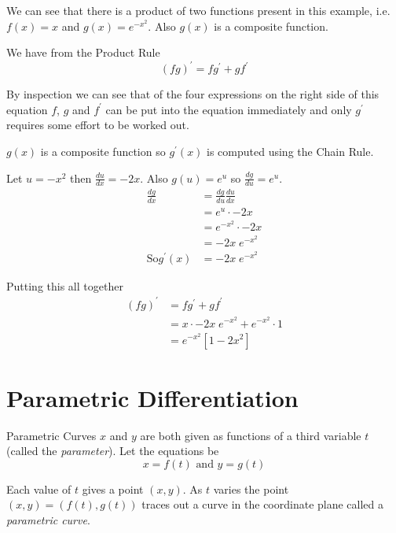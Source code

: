 We can see that there is a product of two functions present in this example, i.e. $f (x) =x$ and $g (x) =e^{ -x^{2}}$. Also $g (x)$ is a composite function. 

We have from the Product Rule
\begin{equation*}\left (f g\right )^{ \prime } =f g^{ \prime } +g f^{ \prime }
\end{equation*}

By inspection we can see that of the four expressions on the right side of this equation $f$, $g$ and $f^{ \prime }$ can be put into the equation immediately and only $g^{ \prime }$ requires some effort to be worked out. 

$g (x)$ is a composite function so $g^{ \prime } (x)$ is computed using the Chain Rule. 

Let $u = -x^{2}$ then $\frac{d u}{d x} = -2 x$. Also $g (u) =e^{u}$ so $\frac{d g}{d u} =e^{u}$.
\begin{align*}\frac{d g}{d x} &  = \frac{d g}{d u} \frac{d u}{d x} \\
 &  = e^{u} \cdot  -2 x \\
 &  = e^{ -x^{2}} \cdot  -2 x \\
 &  =  -2 x\; e^{ -x^{2}} \\
\text{So}g^{ \prime } (x) &  =  -2 x\; e^{ -x^{2}}\end{align*}

Putting this all together
\begin{align*}\left (f g\right )^{ \prime } &  = f g^{ \prime } +g f^{ \prime } \\
 &  = x \cdot  -2 x\; e^{ -x^{2}} +e^{ -x^{2}} \cdot 1 \\
 &  = e^{ -x^{2}} \left [1 -2 x^{2}\right ]\end{align*}




\section{Parametric Differentiation}
Parametric Curves $x$ and $y$ are both given as functions of a third variable $t$ (called the \emph{parameter}). Let the equations be
\begin{equation*}x =f (t)\text{ and }y =g (t)
\end{equation*}

Each value of $t$ gives a point $(x ,y)$. As $t$ varies the point $(x ,y) =(f (t) ,g (t))$ traces out a curve in the coordinate plane called a \emph{parametric curve}. 


